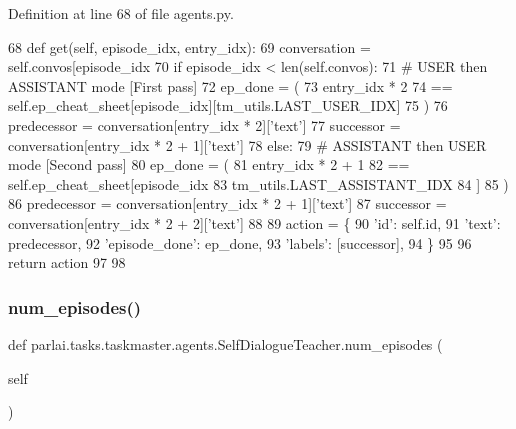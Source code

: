 Definition at line 68 of file agents.\+py.


\begin{DoxyCode}
68     \textcolor{keyword}{def }get(self, episode\_idx, entry\_idx):
69         conversation = self.convos[episode\_idx %
70         \textcolor{keywordflow}{if} episode\_idx < len(self.convos):
71             \textcolor{comment}{# USER then ASSISTANT mode [First pass]}
72             ep\_done = (
73                 entry\_idx * 2
74                 == self.ep\_cheat\_sheet[episode\_idx][tm\_utils.LAST\_USER\_IDX]
75             )
76             predecessor = conversation[entry\_idx * 2][\textcolor{stringliteral}{'text'}]
77             successor = conversation[entry\_idx * 2 + 1][\textcolor{stringliteral}{'text'}]
78         \textcolor{keywordflow}{else}:
79             \textcolor{comment}{# ASSISTANT then USER mode [Second pass]}
80             ep\_done = (
81                 entry\_idx * 2 + 1
82                 == self.ep\_cheat\_sheet[episode\_idx %
83                     tm\_utils.LAST\_ASSISTANT\_IDX
84                 ]
85             )
86             predecessor = conversation[entry\_idx * 2 + 1][\textcolor{stringliteral}{'text'}]
87             successor = conversation[entry\_idx * 2 + 2][\textcolor{stringliteral}{'text'}]
88 
89         action = \{
90             \textcolor{stringliteral}{'id'}: self.id,
91             \textcolor{stringliteral}{'text'}: predecessor,
92             \textcolor{stringliteral}{'episode\_done'}: ep\_done,
93             \textcolor{stringliteral}{'labels'}: [successor],
94         \}
95 
96         \textcolor{keywordflow}{return} action
97 
98 
\end{DoxyCode}
\mbox{\label{classparlai_1_1tasks_1_1taskmaster_1_1agents_1_1SelfDialogueTeacher_a20da7abc53d7a872ec5346bf81b61593}} 
\subsubsection{\texorpdfstring{num\+\_\+episodes()}{num\_episodes()}}
{\footnotesize\ttfamily def parlai.\+tasks.\+taskmaster.\+agents.\+Self\+Dialogue\+Teacher.\+num\+\_\+episodes (\begin{DoxyParamCaption}\item[{}]{self }\end{DoxyParamCaption})}



